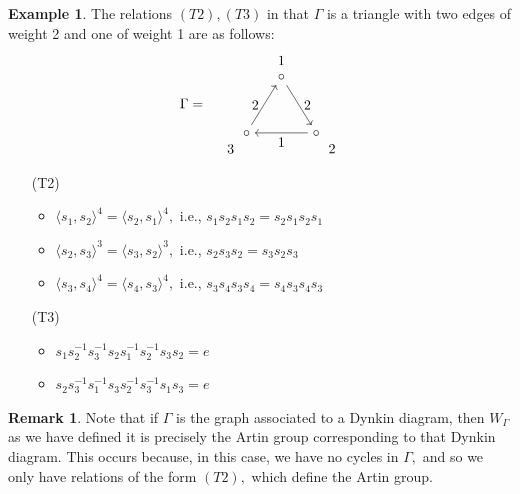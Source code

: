 \documentclass[11pt]{amsart}
\theoremstyle{definition}
\newtheorem{ex}[thm]{Example}
\newtheorem{rem}[thm]{Remark}
\begin{document}
\begin{ex}
The relations $(T2),(T3)$ in that $\Gamma$ is a triangle with two edges of weight 2 and one of weight 1 are as follows:
\[\Gamma = \begin{tikzpicture}[baseline=-0.5ex]
\matrix[matrix of math nodes,column sep={25pt,between origins},row
    sep={40pt,between origins},nodes={asymmetrical rectangle}] at (0,0)
  {
    && |[name = u]|\circ& \\
    &|[name=dl]| \circ & &|[name=dr]| \circ \\
  };
\draw[->]
   (u) to node[right] {2}(dr)
  ;
  \draw[->]
  (dl) to node[left]{2}(u)
  ;
  \draw[->]
  (dr) to node[below]{1}(dl)
  ;
  \node [yshift = .4 cm] at (u){1};
    \node [yshift = -.4 cm,xshift = .4 cm] at (dr){2};
    \node [yshift = -.4 cm,xshift = -.4 cm] at (dl){3};
   \end{tikzpicture}\]
   \begin{enumerate}
\item[(T2)]
\begin{itemize}
\item $\langle s_1,s_2 \rangle^4 = \langle s_2,s_1 \rangle^4,$ i.e., $s_1s_2s_1s_2 = s_2s_1s_2s_1$
\item $\langle s_2,s_3 \rangle^3 = \langle s_3,s_2 \rangle^3,$ i.e., $s_2s_3s_2 = s_3s_2s_3$
\item $\langle s_3,s_4 \rangle^4 = \langle s_4,s_3 \rangle^4,$ i.e., $s_3s_4s_3s_4 = s_4s_3s_4s_3$              
\end{itemize}
\item[(T3)]
\begin{itemize}
\item $s_1s_2^{-1}s_3^{-1}s_2s_1^{-1}s_2^{-1}s_3s_2 = e$

\item $s_2s_3^{-1}s_1^{-1}s_3s_2^{-1}s_3^{-1}s_1s_3 =e$

\end{itemize}
\end{enumerate}
\end{ex}



\begin{rem}
Note that if $\Gamma$ is the graph associated to a Dynkin diagram, then $W_\Gamma$ as we have defined it is precisely the Artin group corresponding to that Dynkin diagram. This occurs because, in this case, we have no cycles in $\Gamma,$ and so we only have relations of the form $(T2),$ which define the Artin group.
\end{rem}
\end{document}
